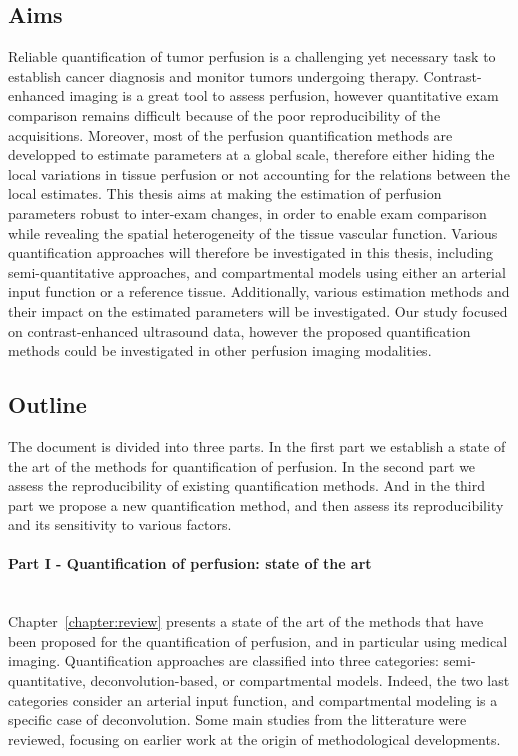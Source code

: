 \subsection{Aims}
Reliable quantification of tumor perfusion is a challenging yet necessary task to establish cancer diagnosis and monitor tumors undergoing therapy.
Contrast-enhanced imaging is a great tool to assess perfusion, however quantitative exam comparison remains difficult because of the poor reproducibility of the acquisitions.
Moreover, most of the perfusion quantification methods are developped to estimate parameters at a global scale, therefore either hiding the local variations in tissue perfusion or not accounting for the relations between the local estimates.
This thesis aims at making the estimation of perfusion parameters robust to inter-exam changes, in order to enable exam comparison while revealing the spatial heterogeneity of the tissue vascular function.
Various quantification approaches will therefore be investigated in this thesis, including semi-quantitative approaches, and compartmental models using either an arterial input function or a reference tissue.
Additionally, various estimation methods and their impact on the estimated parameters will be investigated.
Our study focused on contrast-enhanced ultrasound data, however the proposed quantification methods could be investigated in other perfusion imaging modalities.

\subsection{Outline}
The document is divided into three parts. 
In the first part we establish a state of the art of the methods for quantification of perfusion.
In the second part we assess the reproducibility of existing quantification methods.
And in the third part we propose a new quantification method, and then assess its reproducibility and its sensitivity to various factors.

\paragraph{Part I - Quantification of perfusion: state of the art}\\
Chapter~\ref{chapter:review} presents a state of the art of the methods that have been proposed for the quantification of perfusion, and in particular using medical imaging.
Quantification approaches are classified into three categories: semi-quantitative, deconvolution-based, or compartmental models.
Indeed, the two last categories consider an arterial input function, and compartmental modeling is a specific case of deconvolution.
Some main studies from the litterature were reviewed, focusing on earlier work at the origin of methodological developments.


